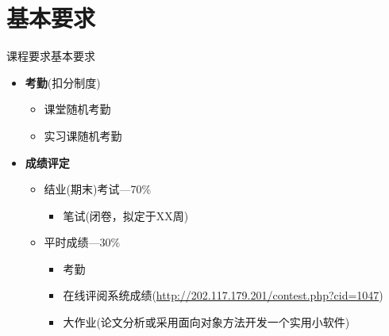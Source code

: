 \section[要求]{基本要求}\label{sec:chap00-sec03}
\begin{frame}{课程要求}{基本要求}
  \stretchon
  \begin{itemize}
  \item {\bfseries 考勤}(\alert{扣分制度})
    \begin{itemize}
    \item 课堂随机考勤
    \item 实习课随机考勤
    \end{itemize}
  \item  {\bfseries 成绩评定}
    \begin{itemize}
    \item 结业(期末)考试---\alert{70\%}
      \begin{itemize}
      \item 笔试(\alert{闭卷}，拟定于XX周)
      \end{itemize}
    \item 平时成绩---\alert{30\%}
      \begin{itemize}
      \item 考勤      
      \item 在线评阅系统成绩(\url{http://202.117.179.201/contest.php?cid=1047})
      \item 大作业(论文分析或采用面向对象方法开发一个实用小软件)
      \end{itemize}
    \end{itemize}
  \end{itemize}
  \stretchoff
\end{frame}

